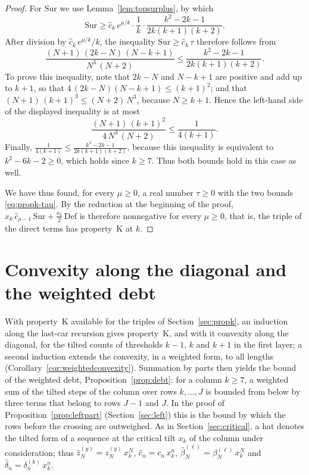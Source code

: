 \documentclass{amsart}
\theoremstyle{definition}
\theoremstyle{remark}
\numberwithin{equation}{section}
\begin{document}
\begin{proof}
For $\mathrm{Sur}$ we use Lemma~\ref{lem:topsurplus}, by which
\[
\mathrm{Sur}\ge\hat c_k\,e^{\mu/k}\cdot\frac1k\cdot\frac{k^2-2k-1}{2k(k+1)(k+2)}.
\]
After division by $\hat c_k\,e^{\mu/k}/k$, the inequality $\mathrm{Sur}\ge\hat c_k\,\tau$ therefore follows from
\[
\frac{(N+1)\,(2k-N)\,(N-k+1)}{N^3\,(N+2)}\le\frac{k^2-2k-1}{2k(k+1)(k+2)}.
\]
To prove this inequality, note that $2k-N$ and $N-k+1$ are positive and add up to $k+1$, so that $4\,(2k-N)(N-k+1)\le(k+1)^2$; and that $(N+1)\,(k+1)^3\le(N+2)\,N^3$, because $N\ge k+1$. Hence the left-hand side of the displayed inequality is at most
\[
\frac{(N+1)\,(k+1)^2}{4\,N^3\,(N+2)}\le\frac{1}{4(k+1)}.
\]
Finally, $\frac{1}{4(k+1)}\le\frac{k^2-2k-1}{2k(k+1)(k+2)}$, because this inequality is equivalent to $k^2-6k-2\ge 0$, which holds since $k\ge 7$. Thus both bounds hold in this case as well.

We have thus found, for every $\mu\ge 0$, a real number $\tau\ge 0$ with the two bounds \eqref{eq:propk-tau}. By the reduction at the beginning of the proof, $x_k\,\hat c_{\rho-1}\,\mathrm{Sur}+\frac{x_k}{2}\,\mathrm{Def}$ is therefore nonnegative for every $\mu\ge 0$, that is, the triple of the direct terms has property~K at $k$.
\end{proof}

\section{Convexity along the diagonal and the weighted debt}\label{sec:layer}
With property~K available for the triples of Section~\ref{sec:propk}, an induction along the last-car recursion gives property~K, and with it convexity along the diagonal, for the tilted counts of thresholds $k-1$, $k$ and $k+1$ in the first layer; a second induction extends the convexity, in a weighted form, to all lengths (Corollary~\ref{cor:weightedconvexity}). Summation by parts then yields the bound of the weighted debt, Proposition~\ref{prop:debt}: for a column $k\ge 7$, a weighted sum of the tilted steps of the column over rows $k,\dots,J$ is bounded from below by three terms that belong to rows $J-1$ and $J$. In the proof of Proposition~\ref{prop:leftpart} (Section~\ref{sec:left}) this is the bound by which the rows before the crossing are outweighed. As in Section~\ref{sec:critical}, a hat denotes the tilted form of a sequence at the critical tilt $x_k$ of the column under consideration; thus $\hat z^{(y)}_N=z^{(y)}_N\,x_k^{N}$, $\hat c_n=c_n\,x_k^{n}$, $\hat\beta^{(\ell)}_N=\beta^{(\ell)}_N\,x_k^{N}$ and $\hat\delta_n=\delta^{(k)}_n\,x_k^{n}$.
\end{document}
